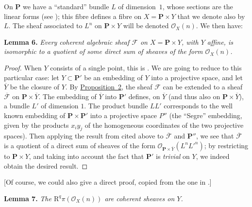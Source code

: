 \documentclass{article}
\newenvironment{itenv}[1]
  {\phantomsection\par\medskip\noindent\textbf{#1.}\itshape}
  {\par\medskip}
\newcommand{\scr}[1]{{\mathscr{#1}}}
\newcommand{\RR}{\mathrm{R}}
\newcommand{\PP}{\mathbf{P}}
\begin{document}
On $\PP$ we have a ``standard'' bundle $L$ of dimension~$1$, whose sections are the linear forms (see \cite[chap.~III, \S~2]{12});
this fibre defines a fibre on $X=\PP\times Y$ that we denote also by $L$.
The sheaf associated to $L^n$ on $\PP\times Y$ will be denoted $\scr{O}_X(n)$.
We then have:

\begin{itenv}{Lemma 6}
\label{lemma6}
  Every coherent algebraic sheaf $\scr{F}$ on $X=\PP\times Y$, with $Y$ affine, is isomorphic to a quotient of some direct sum of sheaves of the form $\scr{O}_X(n)$.
\end{itenv}

\begin{proof}
  When $Y$ consists of a single point, this is \cite[th\'{e}or\`{e}me~1, p.~247]{12}.  
  We are going to reduce to this particular case: let $Y\subset\PP'$ be an embedding of $Y$ into a projective space, and let $\overline{Y}$ be the closure of $Y$.
  By \hyperref[proposition2]{Proposition~2}, the sheaf $\scr{F}$ can be extended to a sheaf $\overline{\scr{F}}$ on $\PP\times\overline{Y}$.
  The embedding of $\overline{Y}$ into $\PP'$ defines, on $\overline{Y}$ (and thus also on $\PP\times\overline{Y}$), a bundle $L'$ of dimension $1$.
  The product bundle $LL'$ corresponds to the well known embedding of $\PP\times\PP'$ into a projective space $P''$ (the ``Segre'' embedding, given by the products $x_i y_j$ of the homogeneous coordinates of the two projective spaces).
  Then applying the result from \cite{12} cited above to $\overline{\scr{F}}$ and $\PP''$, we see that $\overline{\scr{F}}$ is a quotient of a direct sum of sheaves of the form $\scr{O}_{\PP\times\overline{Y}}(L^nL'^n)$;
  by restricting to $\PP\times Y$, and taking into account the fact that $\PP'$ is \emph{trivial} on $Y$, we indeed obtain the desired result.
\end{proof}

  [Of course, we could also give a direct proof, copied from the one in \cite{12}.]

\begin{itenv}{Lemma 7}
\label{lemma7}
  The $\RR^q\pi(\scr{O}_X(n))$ are coherent sheaves on $Y$.
\end{itenv}
\end{document}
